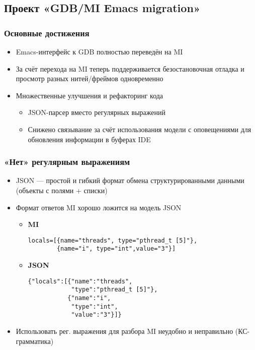 \documentclass[onlymath]{beamer}
\begin{document}
\subsection{Проект «GDB/MI Emacs migration»}
\begin{frame}
  \frametitle{Основные достижения}
  \begin{itemize}
  \item Emacs-интерфейс к GDB полностью переведён на MI
  \item За счёт перехода на MI теперь поддерживается безостановочная
    отладка и просмотр разных нитей/фреймов одновременно
  \item Множественные улучшения и рефакторинг кода
    \begin{itemize}
    \item JSON-парсер вместо регулярных выражений
    \item Снижено связывание за счёт использования модели с оповещениями
      для обновления информации в буферах IDE
    \end{itemize}
  \end{itemize}
\end{frame}

\begin{frame}[fragile]
  \frametitle{«Нет» регулярным выражениям}
  \begin{itemize}
  \item JSON — простой и гибкий формат обмена структурированными
    данными (объекты с полями + списки)
  \item Формат ответов MI хорошо ложится на модель JSON
    \begin{itemize}
    \item \textbf{MI}
\begin{lstlisting}
locals=[{name="threads", type="pthread_t [5]"},
        {name="i", type="int",value="3"}]
\end{lstlisting}

    \item \textbf{JSON}
\begin{lstlisting}
{"locals":[{"name":"threads", 
            "type":"pthread_t [5]"},
           {"name":"i", 
            "type":"int", 
            "value":"3"}]}
\end{lstlisting}
    \end{itemize}
  \item Использовать рег. выражения для разбора MI неудобно и
    неправильно (КС-грамматика)
  \end{itemize}
\end{frame}
\end{document}
